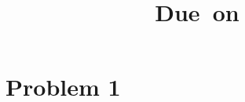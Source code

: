 \documentclass[12pt]{article}
\title{
	\vspace{2in}
	\textmd{\textbf{\hmwkClass}}\\
	\normalsize\vspace{0.1in}{\hmwkTitle}\\
	\normalsize\vspace{0.1in}\small{Due\ on\ \hmwkDueDate}\\
}
\author{\hmwkAuthorName}
\date{}
\begin{document}
	\maketitle
	\clearpage
	\section{Problem 1}
\end{document}

